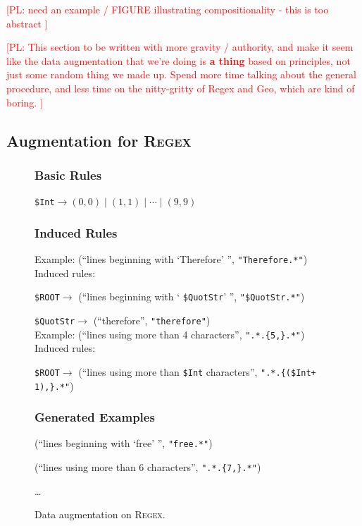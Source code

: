 \documentclass[11pt,letterpaper]{article}
\newcommand{\regex}{\textsc{Regex}\xspace}
\newcommand{\catroot}{\texttt{\$ROOT}\xspace}
\newcommand{\catquotstr}{\texttt{\$QuotStr}\xspace}
\newcommand{\catint}{\texttt{\$Int}\xspace}
\newcommand\pl[1]{\textcolor{red}{[PL: #1]}}
\begin{document}
\pl{need an example / FIGURE illustrating compositionality - this is too abstract
}

\pl{This section to be written with more gravity / authority,
  and make it seem like the data augmentation that we're doing is \textbf{a thing}
  based on principles, not just some random thing we made up.
  Spend more time talking about the general procedure,
  and less time on the nitty-gritty of Regex and Geo,
  which are kind of boring.
}


\subsection{Augmentation for \regex}
\begin{figure}[t] 
\small
\begin{framed}
\footnotesize
\subsubsection*{Basic Rules}
\catint $\to (0, 0) \mid (1, 1) \mid \dotsb \mid (9, 9)$

\subsubsection*{Induced Rules}
Example: (``lines beginning with `Therefore' '', \texttt{"Therefore.*"})\\
Induced rules:

\quad \catroot $\to$ (``lines beginning with ` \catquotstr ' '', \texttt{"}\catquotstr\texttt{.*"})

\quad \catquotstr $\to$ (``therefore'', \texttt{"therefore"}) \\

Example: (``lines using more than 4 characters'', \texttt{".*.\{5,\}.*"})\\
Induced rules:

\quad \catroot $\to$ (``lines using more than \catint characters'', \texttt{".*.\{(\catint + 1),\}.*"})

\subsubsection*{Generated Examples} 
(``lines beginning with `free' '', \texttt{"free.*"})

(``lines using more than 6 characters'', \texttt{".*.\{7,\}.*"})

\dots
\end{framed}
\caption{Data augmentation on \regex.}
\label{fig:augment-regex}
\end{figure}
\end{document}
